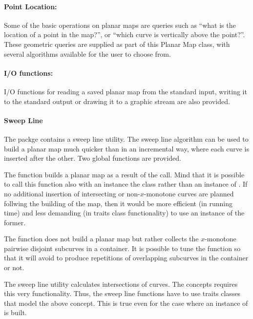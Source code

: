 \paragraph{Point Location:}

Some of the basic operations on planar maps are queries such as ``what is the location of a point in the map?'', or ``which curve is vertically above the point?''.
These geometric queries are supplied as part of this Planar Map class, with 
several algorithms available for the user to choose from.

\paragraph{I/O functions:}
I/O functions for reading a saved planar map from the standard input, 
writing it to the standard output or drawing it to a graphic stream are also provided.


\paragraph{Sweep Line}
  The  packge contains a sweep line
  utility. The sweep line algorithm can be used to build a planar map
  much quicker than in an incremental way, where each curve is
  inserted after the other. Two global functions are provided. 

  The function  builds a planar map
  as a result of the call. Mind that it is possible to call this
  function also with an instance the  class rather
  than an instance of . If no
  additional insertion of intersecting or non-$x$-monotone curves are
  planned follwing the building of the map, then it would be more
  efficient (in running time) and less demanding (in traits class
  functionality) to use an instance of the former.

  The function  does not
  build a planar map but rather collects the $x$-monotone pairwise
  disjoint subcurves in a container. It is possible to tune the
  function so that it will avoid to produce repetitions of overlapping
  subcurves in the container or not.

  The sweep line utility calculates intersections of curves.  The
   concepts requires this
  very functionality.  Thus, the sweep line functions have to use
  traits classes that model the above concept. This is true even for
  the case where an instance of  is built.

